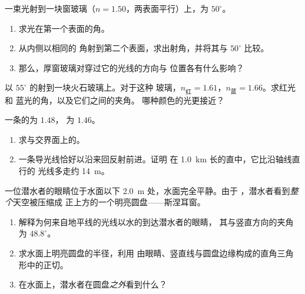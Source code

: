 \begin{exercise}[$\star\star$]\label{exo:g10:refraction:9}
一束光射到一块窗玻璃（$n = 1.50$，两表面平行）上，为 $50^\circ$。
\begin{enumerate}
  \item 求光在第一个表面的角。
  \item {}从内侧以相同的
        角射到第二个表面，求出射角，并将其与 $50^\circ$ 比较。
  \item 那么，厚窗玻璃对穿过它的光线的方向与
        位置各有什么影响？
\end{enumerate}
\end{exercise}

\begin{exercise}[$\star\star$]\label{exo:g10:refraction:10}
以 $55^\circ$ 的射到一块火石玻璃上。对于这种
玻璃，$n_{\text{红}} = 1.61$，$n_{\text{蓝}} = 1.66$。求红光和
蓝光的角，以及它们之间的夹角。
哪种颜色的光更接近？
\end{exercise}

\begin{exercise}[$\star\star$]\label{exo:g10:refraction:11}
一条的为 $1.48$，
为 $1.46$。
\begin{enumerate}
  \item 求与交界面上的。
  \item 一条导光线恰好以沿来回反射前进。证明
        在 \qty{1.0}{km} 长的直中，它比沿轴线直行的
        光线多走约 \qty{14}{m}。
\end{enumerate}
\end{exercise}

\begin{exercise}[$\star\star\star$]\label{exo:g10:refraction:12}
一位潜水者的眼睛位于水面以下 \qty{2.0}{m} 处，水面完全平静。由于
，潜水者看到\emph{整个}天空被压缩成
正上方的一个明亮圆盘——斯涅耳窗。
\begin{enumerate}
  \item 解释为何来自地平线的光线以水的到达潜水者的眼睛，
        其与竖直方向的夹角为 $48.8^\circ$。
  \item 求水面上明亮圆盘的半径，利用
        由眼睛、竖直线与圆盘边缘构成的直角三角形中的正切。
  \item 在水面上，潜水者在圆盘\emph{之外}看到什么？
\end{enumerate}
\end{exercise}

